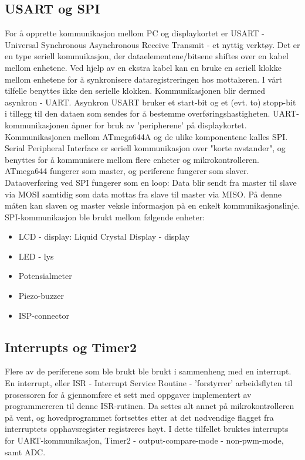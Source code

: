 \documentclass[11pt, a4paper]{report}
\begin{document}
\subsection{USART og SPI}
For å opprette kommunikasjon mellom PC og displaykortet er USART - Universal Synchronous Asynchronous Receive Transmit - et nyttig verktøy. Det er en type seriell kommuikasjon, der dataelementene/bitsene shiftes over en kabel mellom enhetene. Ved hjelp av en ekstra kabel kan en bruke en seriell klokke mellom enhetene for å synkronisere dataregistreringen hos mottakeren. I vårt tilfelle benyttes ikke den serielle klokken. Kommunikasjonen blir dermed asynkron - UART. Asynkron USART bruker et start-bit og et (evt. to) stopp-bit i tillegg til den dataen som sendes for å bestemme overføringshastigheten. UART-kommunikasjonen åpner for bruk av 'peripherene' på displaykortet. Kommunikasjonen mellom ATmega644A og de ulike komponentene kalles SPI. Serial Peripheral Interface er seriell kommunikasjon over "korte avstander", og benyttes for å kommunisere mellom flere enheter og mikrokontrolleren. ATmega644 fungerer som master, og periferene fungerer som slaver. Dataoverføring ved SPI fungerer som en loop: Data blir sendt fra master til slave via MOSI samtidig som data mottas fra slave til master via MISO. På denne måten kan slaven og master veksle informasjon på en enkelt kommunikasjonslinje. SPI-kommunikasjon ble brukt mellom følgende enheter:

\begin{itemize}
\item LCD - display: Liquid Crystal Display - display
\item LED - lys
\item Potensialmeter
\item Piezo-buzzer
\item ISP-connector 
\end{itemize}

\subsection{Interrupts og Timer2}
Flere av de periferene som ble brukt ble brukt i sammenheng med en interrupt. En interrupt, eller ISR - Interrupt Service Routine - 'forstyrrer' arbeidsflyten til prosessoren for å gjennomføre et sett med oppgaver implementert av programmereren til denne ISR-rutinen. Da settes alt annet på mikrokontrolleren på vent, og hovedprogrammet fortsettes etter at det nødvendige flagget fra interruptets opphavsregister registreres høyt. I dette tilfellet bruktes interrupts for UART-kommunikasjon, Timer2 - output-compare-mode - non-pwm-mode, samt ADC. 
\end{document}
